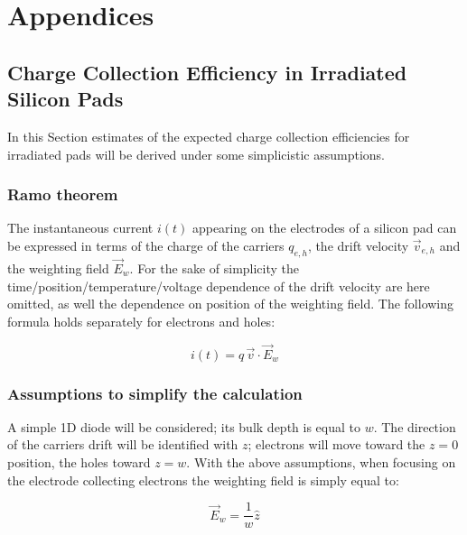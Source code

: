 \chapter{Appendices}



\section{Charge Collection Efficiency in Irradiated Silicon Pads}
\label{sec:CCEirr}

In this Section estimates of the expected charge collection efficiencies 
for irradiated pads will be derived under some simplicistic assumptions.

\subsection{Ramo theorem}
\label{sec:ramo}
The instantaneous current $i(t)$ appearing on the electrodes of a silicon pad can be expressed 
in terms of the charge of the carriers $q_{e,h}$, the drift velocity $\vec{v}_{e,h}$  and the 
weighting field $\vec{E}_w$. For the sake of simplicity the time/position/temperature/voltage 
dependence of the drift velocity are here omitted, as well the dependence on position of the 
weighting field.
The following formula holds separately for electrons and holes:

\begin{equation}
i(t) = q\,\vec{v}\cdot\vec{E}_w
\end{equation} 

\subsection{Assumptions to simplify the calculation}
\label{sec:assumptions}
A simple 1D diode will be considered; its bulk depth is equal to $w$. The direction of the carriers 
drift will be identified with $z$; electrons will move toward the $z=0$ position, the holes toward $z=w$.
With the above assumptions, when focusing on the electrode collecting electrons 
the weighting field is simply equal to:

\begin{equation}
\vec{E}_w=\dfrac{1}{w}\hat{z}
\end{equation}

